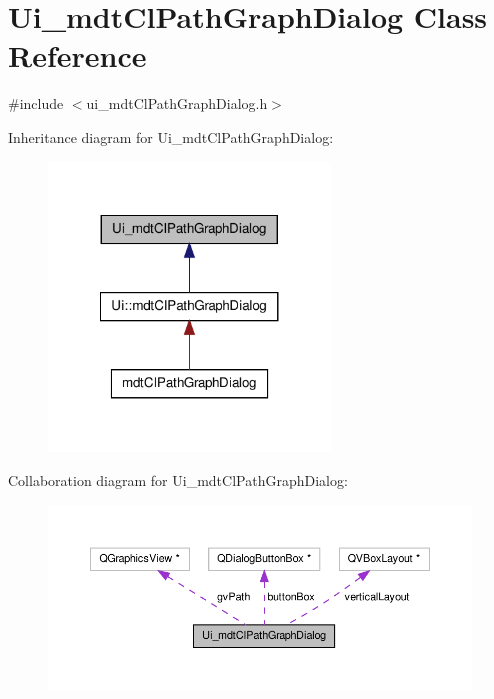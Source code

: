 \hypertarget{class_ui__mdt_cl_path_graph_dialog}{\section{Ui\-\_\-mdt\-Cl\-Path\-Graph\-Dialog Class Reference}
\label{class_ui__mdt_cl_path_graph_dialog}
}


{\ttfamily \#include $<$ui\-\_\-mdt\-Cl\-Path\-Graph\-Dialog.\-h$>$}



Inheritance diagram for Ui\-\_\-mdt\-Cl\-Path\-Graph\-Dialog\-:
\nopagebreak
\begin{figure}[H]
\begin{center}
\leavevmode
\includegraphics[width=212pt]{class_ui__mdt_cl_path_graph_dialog__inherit__graph}
\end{center}
\end{figure}


Collaboration diagram for Ui\-\_\-mdt\-Cl\-Path\-Graph\-Dialog\-:
\nopagebreak
\begin{figure}[H]
\begin{center}
\leavevmode
\includegraphics[width=350pt]{class_ui__mdt_cl_path_graph_dialog__coll__graph}
\end{center}
\end{figure}
